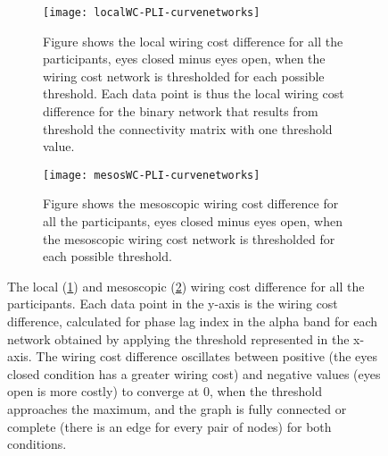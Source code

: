 \documentclass[11pt, onecolumn]{article}
\begin{document}
\begin{figure}[ht] 
  \begin{subfigure}[t]{0.5\linewidth}
    \centering
    \texttt{[image: localWC-PLI-curvenetworks]} 
    \caption{Figure shows the local wiring cost difference for all the participants, eyes closed minus eyes open, when the wiring cost network is thresholded for each possible threshold. Each data point is thus the local wiring cost difference for the binary network that results from threshold the connectivity matrix with one threshold value.} 
    \label{fig:wcindivpats:a} 
    \vspace{4ex}
  \end{subfigure}%
  \hspace{1ex}
  \begin{subfigure}[t]{0.5\linewidth} \hfill
    \centering
    \texttt{[image: mesosWC-PLI-curvenetworks]} 
    \caption{Figure shows the mesoscopic wiring cost difference for all the participants, eyes closed minus eyes open, when the mesoscopic wiring cost network is thresholded for each possible threshold.} 
    \label{fig:wcindivpats:b} 
    \vspace{4ex}
  \end{subfigure} 
  \caption{The local (\ref{fig:wcindivpats:a}) and mesoscopic (\ref{fig:wcindivpats:b}) wiring cost difference for all the participants. Each data point in the y-axis is the wiring cost difference, calculated for phase lag index in the alpha band for each network obtained by applying the threshold represented in the x-axis.
The wiring cost difference oscillates between positive (the eyes closed condition has a greater wiring cost) and negative values (eyes open is more costly) to converge at 0, when the threshold approaches the maximum, and the graph is fully connected or complete (there is an edge for every pair of nodes) for both conditions.}
  \label{fig:wcindivpats} 
\end{figure}

\end{document}
